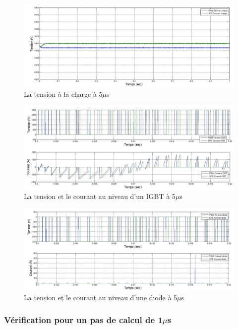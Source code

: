 \documentclass[11pt,letterpaper,final]{report}
\begin{document}
\begin{figure}[htb]
\centering
\includegraphics[scale=0.5]{Fig/AFE3LEVEL/5u/vch.jpg}
\caption{La tension à la charge à 5$\mu$s}
\label{AF_3_vch5}
\end{figure}


\begin{figure}[htb]
\centering
\includegraphics[scale=0.5]{Fig/AFE3LEVEL/5u/IGBT.jpg}
\caption{La tension et le courant au niveau d'un IGBT à 5$\mu$s}
\label{AF_3_IGBT5}
\end{figure}

\begin{figure}[htb]
\centering
\includegraphics[scale=0.5]{Fig/AFE3LEVEL/5u/DIODE.jpg}
\caption{La tension et le courant au niveau d'une diode à 5$\mu$s}
\label{AF_3_DIODE5}
\end{figure}

\clearpage
\subsubsection{Vérification pour un pas de calcul de 1$\mu$s}
\end{document}
